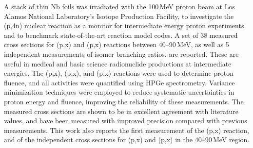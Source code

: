 
A stack  of thin Nb 
foils was irradiated with the 100\,MeV proton beam at  Los Alamos National Laboratory's Isotope Production Facility,  to investigate the (p,4n) nuclear reaction as a  monitor for intermediate energy proton experiments and to benchmark state-of-the-art reaction model codes.
A set of 38 measured  cross sections for  (p,x) and  (p,x) reactions between 40--90\,MeV, as well as 5 independent measurements of isomer branching ratios, are reported. 
These are useful in medical and basic science radionuclide productions at intermediate energies. 
The
(p,x), (p,x), and (p,x)  reactions were used to
determine proton fluence, and all activities were quantified using HPGe spectrometry.
Variance minimization techniques were employed to reduce systematic uncertainties in proton energy and fluence, improving the reliability of these measurements. 
The measured cross sections are shown to be in excellent agreement with  literature values, and have been measured with improved precision compared with previous measurements.
This work also reports the first measurement of the  (p,x) reaction, and of the independent cross sections for    
(p,x) and (p,x) in the 40--90\,MeV region.
